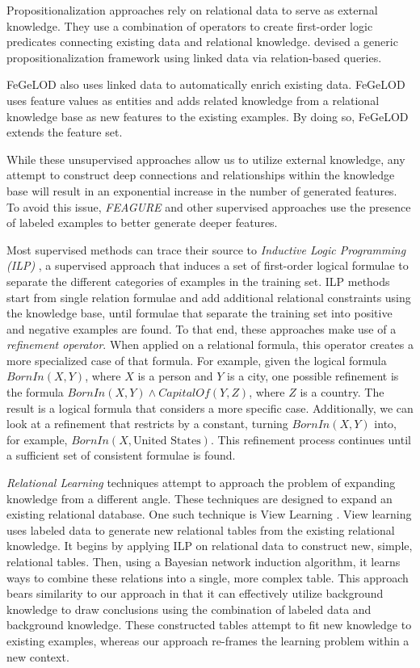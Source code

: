 \documentclass[twoside,11pt]{article}
\theoremstyle{definition}
\begin{document}
	 Propositionalization approaches  rely on relational data to serve as external knowledge. They use a combination of operators to create first-order logic predicates connecting existing data and relational knowledge. 
	 devised a generic propositionalization framework  using linked data via relation-based queries. 
	
	 FeGeLOD \cite{paulheim2012unsupervisedfull} also uses linked data to automatically enrich existing data. 
	FeGeLOD uses feature values as entities and adds related knowledge from a relational knowledge base as new features to the existing examples. By doing so, FeGeLOD extends the feature set.
	
	While these unsupervised approaches allow us to utilize external knowledge, any attempt to construct deep connections and relationships within the knowledge base will result in an exponential increase in the number of generated features.
	To avoid this issue, \emph{FEAGURE} and other supervised approaches use the presence of labeled examples to better generate deeper features.
	
	Most supervised methods can trace their source to \emph{Inductive Logic Programming (ILP)} \cite{muggleton1991inductive}, a supervised approach that induces a set of first-order logical formulae to separate the different categories of examples in the training set.
	ILP methods start from single relation formulae and add additional relational constraints using the knowledge base, until formulae that separate the training set into positive and negative examples are found. To that end, these approaches make use of a \emph{refinement operator}. When applied on a relational formula, this operator creates a more specialized case of that formula. For example, given the logical formula $BornIn(X,Y)$, where $X$ is a person and $Y$ is a city, one possible refinement is the formula $BornIn(X,Y)\land CapitalOf(Y,Z)$, where $Z$ is a country. The result is a logical formula that considers a more specific case. Additionally, we can look at a refinement that restricts by a constant, turning $BornIn(X,Y)$ into, for example, $BornIn(X, \mbox{{United States}})$. This refinement process continues until a sufficient set of consistent formulae is found. 

\emph{Relational Learning} techniques attempt to approach the problem of expanding knowledge from a different angle. These techniques are designed to expand an existing relational database. One such technique is View Learning . View learning uses labeled data to generate new relational tables from the existing relational knowledge.
It begins by applying ILP on relational data to construct new, simple, relational tables. Then,  using a Bayesian network induction algorithm, it learns ways to combine these relations into a single, more complex table.
This approach bears similarity to our approach in that it can effectively utilize background knowledge to draw conclusions using the combination of labeled data and background knowledge. These constructed tables attempt to fit new knowledge to existing examples, whereas our approach re-frames the learning problem within a new context.
\end{document}
